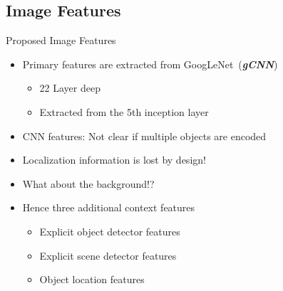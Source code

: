 \documentclass{beamer}
\begin{document}
\subsection{Image Features}
\begin{frame}{Proposed Image Features}
    \begin{itemize}
            \item Primary features are extracted from GoogLeNet~(\textbf{\emph{gCNN}})
        \begin{itemize}
            \item 22 Layer deep
            \item Extracted from the 5th inception layer 
        \end{itemize}
        \item CNN features: Not clear if multiple objects are encoded 
        \item Localization information is lost by design! 
        \item What about the background!? 
        \item Hence three additional context features 
           \begin{itemize}
               \item Explicit object detector features
               \item Explicit scene detector features 
               \item Object location features 
           \end{itemize}
    \end{itemize}
\end{frame}
\end{document}
